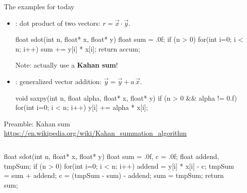 \begin{frame}[fragile]{The examples for today}
	\begin{itemize}
		\item {}: dot product of two vectors: $r = \vec{x}\cdot\vec{y}$.
		\begin{ccode}
float sdot(int n, float* x, float* y) {
	float sum = .0f;
	if (n > 0) {
		for(int i=0; i < n; i++)
			sum += y[i] * x[i];
	}
	return accum;
}
		\end{ccode}
	Note: actually use a \textbf{Kahan sum}!
		\item {}: generalized vector addition: $\vec y = \vec y + a\,\vec x$.
		\begin{ccode}
void saxpy(int n, float alpha, float* x, float* y) {
	if (n > 0 && alpha != 0.f) {
		for(int i=0; i < n; i++)
			y[i] += alpha * x[i];
	}
}
		\end{ccode}
	\end{itemize}
\end{frame}

\begin{frame}[fragile]{Preamble: Kahan sum}
	\url{https://en.wikipedia.org/wiki/Kahan_summation_algorithm}
	\begin{columns}
	\begin{ccode}
float sdot(int n, float* x, float* y) {
	float sum = .0f, c = .0f;
	float addend, tmpSum;
	if (n > 0) {
		for(int i=0; i < n; i++) {
			addend = y[i] * x[i] - c;
			tmpSum = sum + addend;
			c = (tmpSum - sum) - addend;
			sum = tmpSum;
		}
	}
	return sum;
}
	\end{ccode}
	\begin{center}
	\end{center}
\end{columns}
\end{frame}

